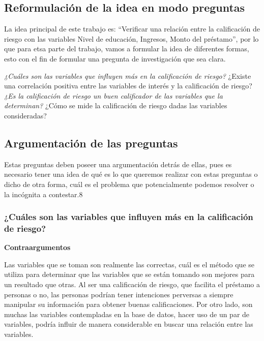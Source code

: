 \documentclass[
  letterpaper,
  DIV=11,
  numbers=noendperiod]{scrreprt}
\begin{document}
\subsection{Reformulación de la idea en modo
preguntas}\label{reformulaciuxf3n-de-la-idea-en-modo-preguntas}

La idea principal de este trabajo es: ``Verificar una relación entre la
calificación de riesgo con las variables Nivel de educación, Ingresos,
Monto del préstamo'', por lo que para etsa parte del trabajo, vamos a
formular la idea de diferentes formas, esto con el fin de formular una
pregunta de investigación que sea clara.

\emph{¿Cuáles son las variables que influyen más en la calificación de
riesgo? }¿Existe una correlación positiva entre las variables de interés
y la calificación de riesgo? \emph{¿Es la calificación de riesgo un buen
calificador de las variables que la determinan? }¿Cómo se mide la
calificación de riesgo dadas las variables consideradas?

\subsection{Argumentación de las
preguntas}\label{argumentaciuxf3n-de-las-preguntas}

Estas preguntas deben poseer una argumentación detrás de ellas, pues es
necesario tener una idea de qué es lo que queremos realizar con estas
preguntas o dicho de otra forma, cuál es el problema que potencialmente
podemos resolver o la incógnita a contestar.8

\subsubsection{¿Cuáles son las variables que influyen más en la
calificación de
riesgo?}\label{cuuxe1les-son-las-variables-que-influyen-muxe1s-en-la-calificaciuxf3n-de-riesgo}

\textbf{Contraargumentos}

Las variables que se toman son realmente las correctas, cuál es el
método que se utiliza para determinar que las variables que se están
tomando son mejores para un resultado que otras. Al ser una calificación
de riesgo, que facilita el préstamo a personas o no, las personas
podrían tener intenciones perversas a siempre manipular su información
para obtener buenas calificaciones. Por otro lado, son muchas las
variables contempladas en la base de datos, hacer uso de un par de
variables, podría influir de manera considerable en buscar una relación
entre las variables.
\end{document}
